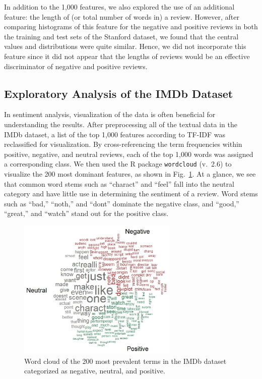 \documentclass[conference]{IEEEtran}
\begin{document}
In addition to the 1,000 features, we also explored the use of an additional feature: the length of (or total number of words in) a review. However, after comparing histograms of this feature for the negative and positive reviews in both the training and test sets of the Stanford dataset, we found that the central values and distributions were quite similar. Hence, we did not incorporate this feature since it did not appear that the lengths of reviews would be an effective discriminator of negative and positive reviews.

\subsection{Exploratory Analysis of the IMDb Dataset}\label{sec:EDA_IMDb}
In sentiment analysis, visualization of the data is often beneficial for understanding the results. After preprocessing all of the textual data in the IMDb dataset, a list of the top 1,000 features according to TF-IDF was reclassified for visualization. By cross-referencing the term frequencies within positive, negative, and neutral reviews, each of the top 1,000 words was assigned a corresponding class. We then used the R package \verb|wordcloud| (v.~2.6) to visualize the 200 most dominant features, as shown in Fig.~\ref{fig:WordCloud}. At a glance, we see that common word stems such as ``charact'' and ``feel'' fall into the neutral category and have little use in determining the sentiment of a review. Word stems such as ``bad,'' ``noth,'' and ``dont'' dominate the negative class, and ``good,'' ``great,'' and ``watch'' stand out for the positive class.

\begin{figure}[tbp]
    \centerline{\includegraphics[width=3in]{figures/WordCloud.eps}}
    \caption{Word cloud of the 200 most prevalent terms in the IMDb dataset categorized as negative, neutral, and positive.}
    \label{fig:WordCloud}
\end{figure}
\end{document}
